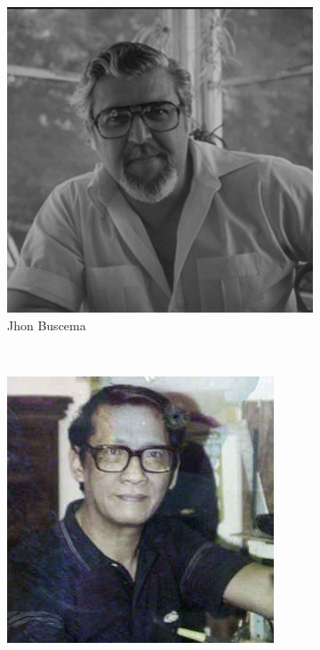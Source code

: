 \begin{frame}{}
\begin{figure}[htp]
 \centering
 \begin{subfigure}[b]{0.16\textwidth}
   \includegraphics[width=\textwidth]{img/artistas/JohnBuscema}
   \caption{Jhon Buscema}
 \end{subfigure}
~
 \begin{subfigure}[b]{0.16\textwidth}
   \includegraphics[width=\textwidth]{img/artistas/AlfredoAlcala}

\end{subfigure}
\end{figure}
\end{frame}

